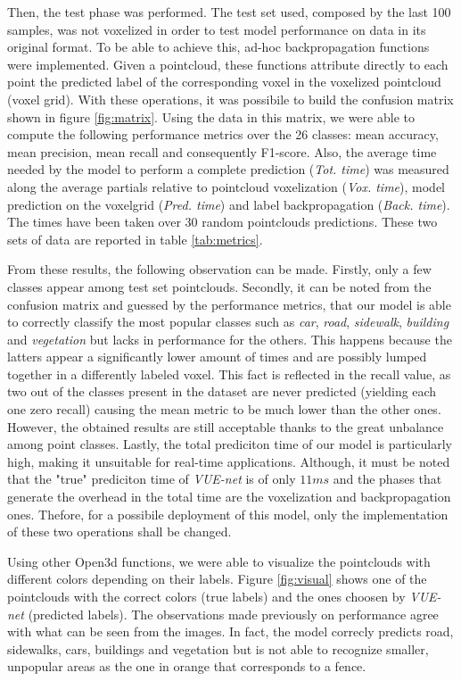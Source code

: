 Then, the test phase was performed. The test set used, composed by the last 100 samples, 
was not voxelized in order to test model performance on data in its original format.
To be able to achieve this, ad-hoc backpropagation functions were implemented.
Given a pointcloud, these functions attribute directly to each point the predicted label of the
corresponding voxel in the voxelized pointcloud (voxel grid).
With these operations, it was possibile to build the confusion matrix shown in figure \ref{fig:matrix}.
Using the data in this matrix, we were able to compute the following performance metrics over the 26 classes: 
mean accuracy, mean precision, mean recall and consequently F1-score.
Also, the average time needed by the model to perform a complete prediction (\textit{Tot. time}) was measured along the average partials relative to
pointcloud voxelization (\textit{Vox. time}), model prediction on the voxelgrid (\textit{Pred. time}) and
label backpropagation (\textit{Back. time}). The times have been taken over 30 random pointclouds predictions.
These two sets of data are reported in table \ref{tab:metrics}.

From these results, the following observation can be made.
Firstly, only a few classes appear among test set pointclouds.
Secondly, it can be noted from the confusion matrix and guessed by the performance metrics, 
that our model is able to correctly classify the most popular classes such as \textit{car},
\textit{road}, \textit{sidewalk}, \textit{building} and \textit{vegetation} 
but lacks in performance for the others. 
This happens because the latters appear a significantly lower amount of times and are possibly lumped together in a differently labeled voxel. 
This fact is reflected in the recall value, as two out of the classes present in the dataset 
are never predicted (yielding each one zero recall) causing the mean metric to be much lower than the other ones.
However, the obtained results are still acceptable thanks to the great unbalance among point classes.
Lastly, the total prediciton time of our model is particularly high,
making it unsuitable for real-time applications. Although, it must be noted that the "true" prediciton time
of \textit{VUE-net} is of only $11ms$ and the phases that generate the overhead in the total time
are the voxelization and backpropagation ones. Thefore, for a possibile deployment of this model, only the 
implementation of these two operations shall be changed.

Using other Open3d functions, we were able to visualize the pointclouds with different colors depending
on their labels. Figure \ref{fig:visual} shows one of the pointclouds with the
correct colors (true labels) and the ones choosen by \textit{VUE-net} (predicted labels).
The observations made previously on performance agree with what can be seen from the images.
In fact, the model correcly predicts road, sidewalks, cars, buildings and vegetation but is not
able to recognize smaller, unpopular areas as the one in orange that corresponds to a fence.
